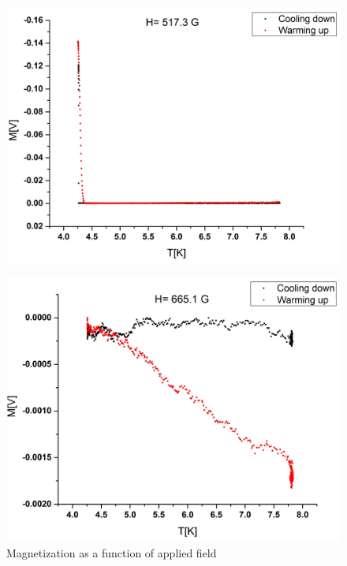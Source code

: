 \documentclass[openany,11pt,a4paper]{report}
\begin{document}
\begin{figure}[H]
\begin{center}
\includegraphics[scale=0.35]{finalseven.jpg}
\end{center}
\end{figure}





\begin{figure}[H]
\begin{center}
\includegraphics[scale=0.35]{finaleight.jpg}
\caption{Magnetization as a function of applied field}
\end{center}
\end{figure}
\end{document}
